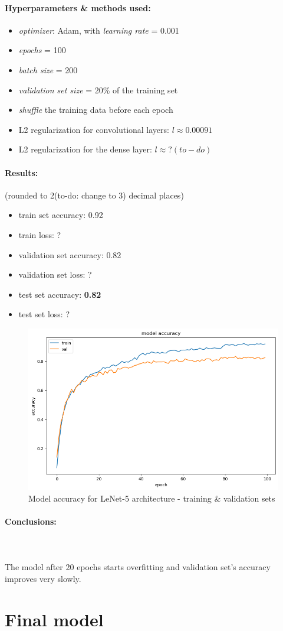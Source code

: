 \documentclass[12pt]{article}
\begin{document}
        \paragraph{Hyperparameters \& methods used:}
        \begin{itemize}
          \item \textit{optimizer}: Adam, with \textit{learning rate} = 0.001
          \item \textit{epochs} = 100
          \item \textit{batch size} = 200
          \item \textit{validation set size} = 20\% of the training set
          \item \textit{shuffle} the training data before each epoch
          \item L2 regularization for convolutional layers: $l \approx 0.00091$
          \item L2 regularization for the dense layer: $l \approx ?(to-do)$
        \end{itemize}
        \paragraph{Results:} (rounded to 2(to-do: change to 3) decimal places)
          \begin{itemize}
            \item train set accuracy: 0.92
            \item train loss: ?
            \item validation set accuracy: 0.82
            \item validation set loss: ?
            \item test set accuracy: \textbf{0.82}
            \item test set loss: ?
          \end{itemize}
              \begin{figure}[H]
                \includegraphics[width=\linewidth]{images/lenet.png}
                \caption{Model accuracy for LeNet-5 architecture - training \& validation sets}
                \label{fig:lenet}
              \end{figure}
        \paragraph{Conclusions:} \mbox{} \\\\
        The model after 20 epochs starts overfitting and validation set's accuracy improves very slowly.
    \section{Final model}
\end{document}
